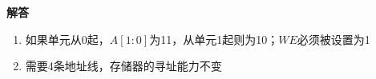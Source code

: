 \documentclass[10pt,a4paper,UTF8]{ctexart}
\newenvironment{solution}{\par\noindent\textbf{解答}\ }{\par}
\begin{document}
\begin{solution}
	\begin{enumerate}[(1)]
		\item 如果单元从0起，$A[1:0]$为11，从单元1起则为10；$WE$必须被设置为1
		\item 需要4条地址线，存储器的寻址能力不变
	\end{enumerate}

\end{solution}
\end{document}
